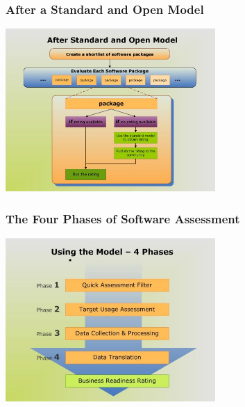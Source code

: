 \documentclass{beamer}
\begin{document}
\begin{frame}
\frametitle{After a Standard and Open Model}

\begin{center}
\includegraphics[width=8cm]{figs/After_standard_and_open_model.jpg}
\end{center}

\end{frame}



\begin{frame}
\frametitle{The Four Phases of Software Assessment}

\begin{center}
\includegraphics[width=8cm]{figs/Using_the_Model_-_4_Phases.jpg}
\end{center}

\end{frame}
\end{document}
